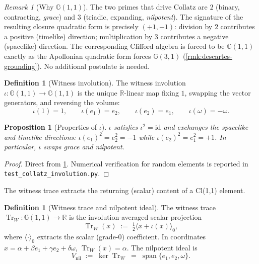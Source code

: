 \documentclass[11pt,a4paper]{article}
\theoremstyle{plain}
\newtheorem{proposition}[theorem]{Proposition}
\theoremstyle{definition}
\newtheorem{definition}[theorem]{Definition}
\theoremstyle{remark}
\newtheorem{remark}[theorem]{Remark}
\numberwithin{equation}{section}
\newcommand{\Cl}{\mathbb{G}}
\newcommand{\R}{\mathbb{R}}
\DeclareMathOperator{\Tr}{Tr}
\DeclareMathOperator{\spn}{span}
\providecommand{\id}{\mathrm{id}}
\providecommand{\nil}{\mathrm{nil}}
\begin{document}
\begin{remark}[Why $\Cl(1,1)$]
\label{rmk:why-cl11}
The two primes that drive Collatz are $2$ (binary, contracting,
\emph{grace}) and $3$ (triadic, expanding, \emph{nilpotent}).  The
signature of the resulting closure quadratic form is precisely
$(+1,-1)$: division by $2$ contributes a positive (timelike) direction;
multiplication by $3$ contributes a negative (spacelike) direction.
The corresponding Clifford algebra is forced to be $\Cl(1,1)$ exactly
as the Apollonian quadratic form forces $\Cl(3,1)$
(\cref{rmk:descartes-grounding}).  No additional postulate is needed.
\end{remark}

\begin{definition}[Witness involution]
\label{def:witness-involution-cl11}
The witness involution
$\iota:\Cl(1,1)\to\Cl(1,1)$ is the unique $\R$-linear map fixing
$1$, swapping the vector generators, and reversing the volume:
\[
  \iota(1)=1,\qquad
  \iota(e_1)=e_2,\qquad
  \iota(e_2)=e_1,\qquad
  \iota(\omega)=-\omega.
\]
\end{definition}

\medskip
\begin{proposition}[Properties of $\iota$]
\label{prop:iota-properties}
$\iota$ satisfies $\iota^2=\id$ and exchanges the spacelike and
timelike directions:
$\iota(e_1)^2=e_2^2=-1$ while $\iota(e_2)^2=e_1^2=+1$.  In
particular, $\iota$ swaps grace and nilpotent.
\end{proposition}

\begin{proof}
Direct from \cref{def:witness-involution-cl11}.  Numerical
verification for random elements is reported in
\texttt{test\_collatz\_involution.py}.
\end{proof}

\medskip\noindent The witness trace extracts the returning (scalar) content of a Cl(1,1) element.

\begin{definition}[Witness trace and nilpotent ideal]
\label{def:witness-trace-cl11}
The witness trace $\Tr_W:\Cl(1,1)\to\R$ is the involution-averaged
scalar projection
\[
  \Tr_W(x)\;:=\;\tfrac12\bigl\langle x+\iota(x)\bigr\rangle_0,
\]
where $\langle\cdot\rangle_0$ extracts the scalar (grade-$0$)
coefficient.  In coordinates
$x=\alpha+\beta e_1+\gamma e_2+\delta\omega$, $\Tr_W(x)=\alpha$.
The nilpotent ideal is
\[
  V_{\nil}\;:=\;\ker\Tr_W\;=\;\spn\{e_1,e_2,\omega\}.
\]
\end{definition}
\end{document}
